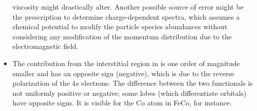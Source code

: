 \documentclass[11pt]{book}
\begin{document}
\begin{itemize}
viscosity might drastically alter. Another possible source of error
might be the prescription to determine charge-dependent spectra, which
assumes a chemical potential to modify the particle species abundances
without considering any modification of the momentum distribution
due to the electromagnetic field.
\item The contribution from the interstitial region in \cite{tran2020shortcomings}
is one order of magnitude smaller and has an opposite sign (negative),
which is due to the reverse polarization of the $4s$ electrons. The
difference between the two functionals is not uniformly positive or
negative; some lobes (which differentiate orbitals) have opposite
signs. It is visible for the Co atom in FeCo, for instance.
\end{itemize}

\end{document}
